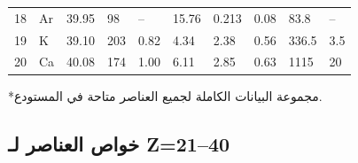 \documentclass[11pt,a4paper]{article}
\begin{document}
\begin{otherlanguage}{arabic}
\begin{longtable}{p{0.6cm}p{1.2cm}p{1.2cm}p{1.2cm}p{1.2cm}p{1.2cm}p{1.5cm}p{1.2cm}p{1.2cm}p{1.2cm}}
			18 & Ar & 39.95  & 98   & –    & 15.76 & 0.213 & 0.08  & 83.8  & – \\
			19 & K  & 39.10  & 203  & 0.82 & 4.34  & 2.38  & 0.56  & 336.5 & 3.5 \\
			20 & Ca & 40.08  & 174  & 1.00 & 6.11  & 2.85  & 0.63  & 1115  & 20 \\
			\bottomrule
		\end{longtable}
		\vspace{0.2cm}
		*مجموعة البيانات الكاملة لجميع العناصر متاحة في المستودع.
		
		\subsection*{خواص العناصر لـ Z=21–40}
		

\end{otherlanguage}
\end{document}
